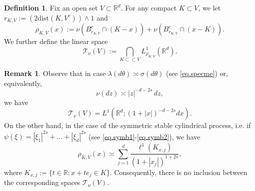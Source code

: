 \documentclass[11pt,a4paper,reqno]{amsart}
\theoremstyle{definition}
\newtheorem{definition}[theorem]{Definition}
\newtheorem{remark}[theorem]{Remark}
\numberwithin{equation}{section}
\begin{document}
\begin{definition}
\label{def.space1}
Fix an open set $V\subset \mathbb R^d$.
For any compact $K\subset V$, we let   $r_{K,V}:=(2\text{dist}(K,V^c))\wedge 1$ and 
\[
\rho_{K,V}(x):= \nu(B^c_{r_{K,V}}\cap (K-x))+\nu(B^c_{r_{K,V}}\cap (x-K)).
\]
 We further define the linear space 
\[
\mathscr T_\nu(V):= \bigcap _{K\subset\subset V} L^1_{\rho_{K,V}}(\mathbb R^d).
\]
\end{definition}

\begin{remark}
Observe that in case $\lambda(d \theta) \asymp \sigma(d \theta)$ (see \eqref{eq.specme}) 
or, equivalently, 
$$
\nu(dz) \asymp|z|^{-d-2 s}\, d z,
$$
we have
$$
\mathscr{T}_\nu(V) =  L^1(\mathbb{R}^d; (1+|x|)^{-d-2 s} d x).
$$
On the other hand, in the case of the symmetric stable cylindrical process, i.e. if $\psi(\xi)=|\xi_1|^{2s}+ \dots +|\xi_d|^{2s}$ (see \eqref{eq.symb1}-\eqref{eq.symb2}), we have 
\[
\rho_{K,V}(x) \asymp \sum_{j=1}^d \frac{\ell^1\left(K_{x, j}\right)}{\left(1+\left|x_j\right|\right)^{1+2 s}},
\]
where $K_{x, j}:=\{t \in \mathbb{R}: x+t e_j \in K\}$.
Consequently, there is no inclusion between the corresponding spaces $\mathscr T_\nu(V)$.
\end{remark}
\end{document}
